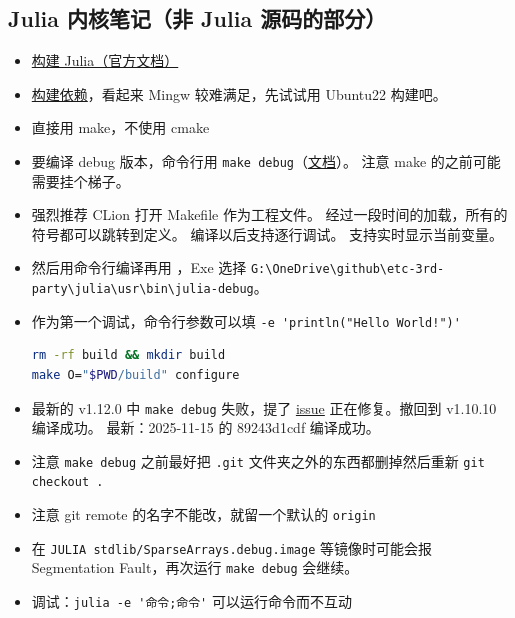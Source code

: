 \subsection{Julia 内核笔记（非 Julia 源码的部分）}
\begin{itemize}
\item \href{https://docs.julialang.org/en/v1/devdocs/build/build/}{构建 Julia（官方文档）}
\item \href{https://docs.julialang.org/en/v1/devdocs/build/build/#Required-Build-Tools-and-External-Libraries}{构建依赖}，看起来 Mingw 较难满足，先试试用 Ubuntu22 构建吧。
\item 直接用 make，不使用 cmake
\item 要编译 debug 版本，命令行用 \verb`make debug`（\href{https://docs.julialang.org/en/v1/devdocs/backtraces/}{文档}）。 注意 make 的之前可能需要挂个梯子。
\item 强烈推荐 CLion 打开 Makefile 作为工程文件。 经过一段时间的加载，所有的符号都可以跳转到定义。 编译以后支持逐行调试。 支持实时显示当前变量。
\item 然后用命令行编译再用 ，Exe 选择 \verb`G:\OneDrive\github\etc-3rd-party\julia\usr\bin\julia-debug`。
\item 作为第一个调试，命令行参数可以填 \verb`-e 'println("Hello World!")'`
\begin{lstlisting}[language=bash]
rm -rf build && mkdir build
make O="$PWD/build" configure
\end{lstlisting}
\item 最新的 v1.12.0 中 \verb`make debug` 失败，提了 \href{https://github.com/JuliaLang/julia/issues/57675}{issue} 正在修复。撤回到 v1.10.10 编译成功。 最新：2025-11-15 的 89243d1cdf 编译成功。
\item 注意 \verb`make debug` 之前最好把 \verb`.git` 文件夹之外的东西都删掉然后重新 \verb`git checkout .`
\item 注意 git remote 的名字不能改，就留一个默认的 \verb`origin`
\item 在 \verb`JULIA stdlib/SparseArrays.debug.image` 等镜像时可能会报 Segmentation Fault，再次运行 \verb`make debug` 会继续。

\item 调试：\verb`julia -e '命令;命令'` 可以运行命令而不互动
\end{itemize}

